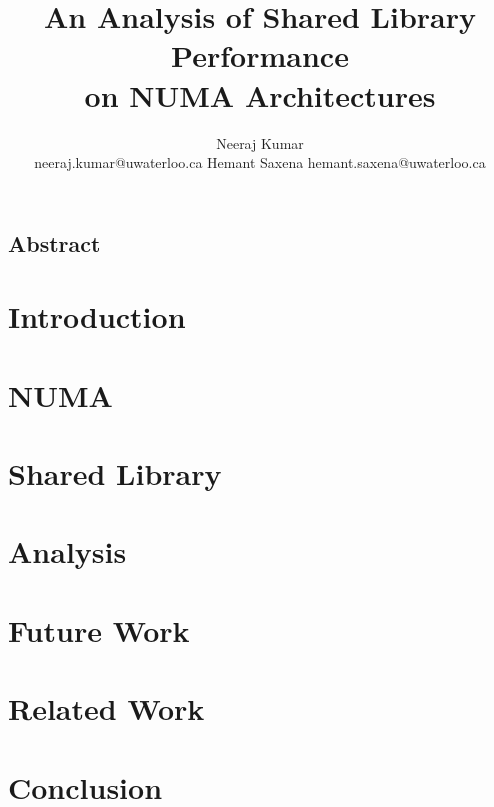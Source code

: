 \documentclass{acm_proc_article-sp}
\title{An Analysis of Shared Library Performance \\ on NUMA Architectures}
\author{
Neeraj Kumar\\
neeraj.kumar@uwaterloo.ca
\alignauthor
Hemant Saxena
hemant.saxena@uwaterloo.ca
}
\begin{document}
\maketitle

\subsection*{Abstract}


\section{Introduction}


\section{NUMA}


\section{Shared Library}


\section{Analysis} \label{sec:analysis}


\section{Future Work} \label{sec:future-work}


\section{Related Work}


\section{Conclusion} \label{sec:conclusion}




\end{document}
